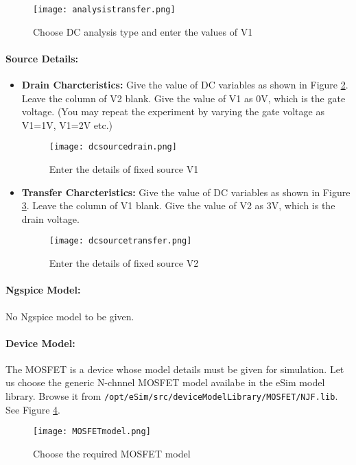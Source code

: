 \begin{figure}[h]
\centering
\texttt{[image: analysistransfer.png]}
\caption{Choose DC analysis type and enter the values of V1}
\label{analysistransfer}
\end{figure}
\paragraph{Source Details:} 
\begin{itemize}
\item \textbf{Drain Charcteristics:} Give the value of DC variables as shown in Figure \ref{dcsourcedrain}. Leave the column of V2 blank. Give the value of V1 as 0V, which is the gate voltage. (You may repeat the experiment by varying the gate voltage as V1=1V, V1=2V etc.)
\begin{figure}[h]
\centering
\texttt{[image: dcsourcedrain.png]}
\caption{Enter the details of fixed source V1}
\label{dcsourcedrain}
\end{figure}

\item \textbf{Transfer Charcteristics:} Give the value of DC variables as shown in Figure \ref{dcsourcetransfer}. Leave the column of V1 blank. Give the value of V2 as 3V, which is the drain voltage. 
\begin{figure}[h]
\centering
\texttt{[image: dcsourcetransfer.png]}
\caption{Enter the details of fixed source V2}
\label{dcsourcetransfer}
\end{figure}

\end{itemize}

\paragraph{Ngspice Model:} No Ngspice model to be given.

\paragraph{Device Model:} The MOSFET is a device whose model details must be given for simulation. Let us choose the generic N-chnnel MOSFET model availabe in the eSim model library. Browse it from \texttt{/opt/eSim/src/deviceModelLibrary/MOSFET/NJF.lib}. See Figure \ref{MOSFETmodel}.
\begin{figure}[h]
\centering
\texttt{[image: MOSFETmodel.png]}
\caption{Choose the required MOSFET model}
\label{MOSFETmodel}
\end{figure}

